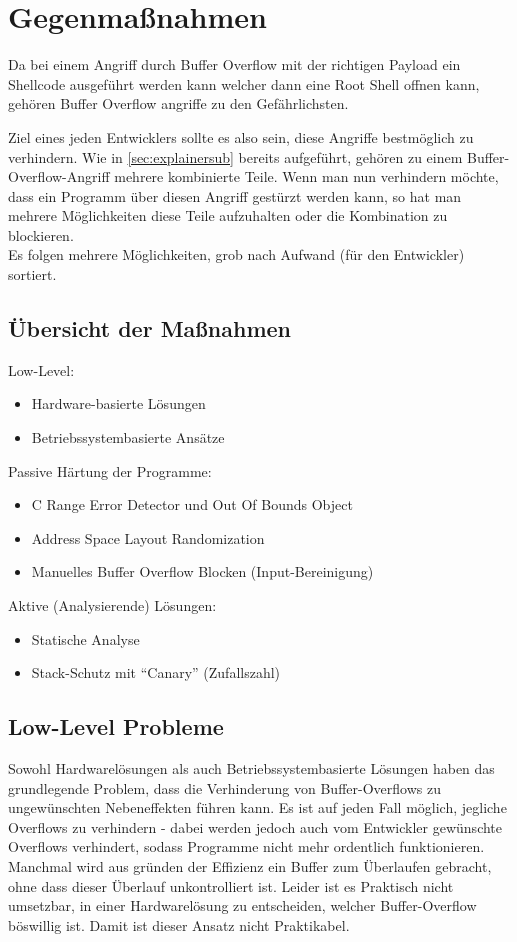 \pagebreak
\section{Gegenmaßnahmen}
Da bei einem Angriff durch Buffer Overflow mit der richtigen Payload
ein Shellcode ausgeführt werden kann welcher dann eine Root Shell
offnen kann, gehören
Buffer Overflow angriffe zu den Gefährlichsten.

Ziel eines jeden Entwicklers sollte es also sein, diese Angriffe bestmöglich
zu verhindern.
Wie in \autoref{sec:explainersub} bereits aufgeführt,
gehören zu einem Buffer-Overflow-Angriff mehrere kombinierte Teile. Wenn
man nun verhindern möchte, dass ein Programm über diesen Angriff gestürzt werden
kann, so hat man mehrere Möglichkeiten diese Teile aufzuhalten oder die Kombination
zu blockieren. \cite{Werthmann2006SurveyOB}\\
Es folgen mehrere Möglichkeiten, grob nach Aufwand (für den Entwickler) sortiert.
\subsection{Übersicht der Maßnahmen}
Low-Level:
\begin{itemize}
    \item Hardware-basierte Lösungen
    \item Betriebssystembasierte Ansätze
\end{itemize}
Passive Härtung der Programme:
\begin{itemize}
    \item C Range Error Detector und Out Of Bounds Object
    \item Address Space Layout Randomization
    \item Manuelles Buffer Overflow Blocken (Input-Bereinigung)
\end{itemize}
Aktive (Analysierende) Lösungen:
\begin{itemize}
    \item Statische Analyse
    \item Stack-Schutz mit ``Canary'' (Zufallszahl)
\end{itemize}

\subsection{Low-Level Probleme}
Sowohl Hardwarelösungen als auch Betriebssystembasierte Lösungen haben
das grundlegende Problem, dass die Verhinderung von Buffer-Overflows zu
ungewünschten Nebeneffekten führen kann. Es ist auf jeden Fall möglich,
jegliche Overflows zu verhindern - dabei werden jedoch auch vom
Entwickler gewünschte Overflows verhindert, sodass Programme nicht mehr
ordentlich funktionieren. Manchmal wird aus gründen der Effizienz ein
Buffer zum Überlaufen gebracht, ohne dass dieser Überlauf unkontrolliert
ist. Leider ist es Praktisch nicht umsetzbar, in einer Hardwarelösung
zu entscheiden, welcher Buffer-Overflow böswillig ist. Damit ist dieser Ansatz
nicht Praktikabel.

